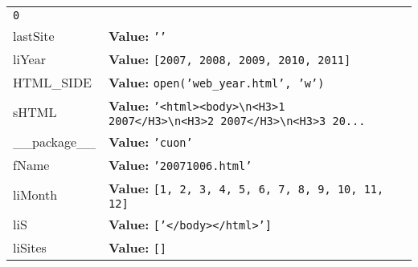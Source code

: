 \begin{longtable}{|p{\varnamewidth}|p{\vardescrwidth}|l}
{\tt 0}&\\
\cline{1-2}
\raggedright l\-a\-s\-t\-S\-i\-t\-e\- & \raggedright \textbf{Value:} 
{\tt \texttt{'}\texttt{}\texttt{'}}&\\
\cline{1-2}
\raggedright l\-i\-Y\-e\-a\-r\- & \raggedright \textbf{Value:} 
{\tt \texttt{[}2007\texttt{, }2008\texttt{, }2009\texttt{, }2010\texttt{, }2011\texttt{]}}&\\
\cline{1-2}
\raggedright H\-T\-M\-L\-\_\-S\-I\-D\-E\- & \raggedright \textbf{Value:} 
{\tt open('web\_year.html', 'w')}&\\
\cline{1-2}
\raggedright s\-H\-T\-M\-L\- & \raggedright \textbf{Value:} 
{\tt \texttt{'}\texttt{{\textless}html{\textgreater}{\textless}body{\textgreater}{\textbackslash}n{\textless}H3{\textgreater}1 2007{\textless}/H3{\textgreater}{\textbackslash}n{\textless}H3{\textgreater}2 2007{\textless}/H3{\textgreater}{\textbackslash}n{\textless}H3{\textgreater}3 20}\texttt{...}}&\\
\cline{1-2}
\raggedright \_\-\_\-p\-a\-c\-k\-a\-g\-e\-\_\-\_\- & \raggedright \textbf{Value:} 
{\tt \texttt{'}\texttt{cuon}\texttt{'}}&\\
\cline{1-2}
\raggedright f\-N\-a\-m\-e\- & \raggedright \textbf{Value:} 
{\tt \texttt{'}\texttt{20071006.html}\texttt{'}}&\\
\cline{1-2}
\raggedright l\-i\-M\-o\-n\-t\-h\- & \raggedright \textbf{Value:} 
{\tt \texttt{[}1\texttt{, }2\texttt{, }3\texttt{, }4\texttt{, }5\texttt{, }6\texttt{, }7\texttt{, }8\texttt{, }9\texttt{, }10\texttt{, }11\texttt{, }12\texttt{]}}&\\
\cline{1-2}
\raggedright l\-i\-S\- & \raggedright \textbf{Value:} 
{\tt \texttt{[}\texttt{'}\texttt{{\textless}/body{\textgreater}{\textless}/html{\textgreater}}\texttt{'}\texttt{]}}&\\
\cline{1-2}
\raggedright l\-i\-S\-i\-t\-e\-s\- & \raggedright \textbf{Value:} 
{\tt \texttt{[}\texttt{]}}&\\
\cline{1-2}
\end{longtable}

